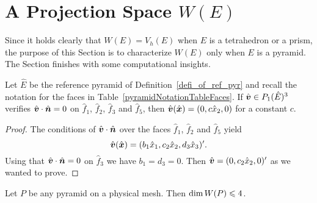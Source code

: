 \section{A Projection Space $W(E)$}
Since it holds clearly that $W(E)=V_h(E)$ when $E$ is a tetrahedron or a prism,
the purpose of this Section is to characterize $W(E)$ only when $E$ is a pyramid.
The Section finishes with some computational insights. 
\begin{lemma}\label{L3}
Let $\hat E$ be the reference pyramid 
of Definition~\ref{defi_of_ref_pyr} and recall the notation for the faces
in Table~\ref{pyramidNotationTableFaces}.
If $\hat{\boldsymbol{v}}\in P_1(\hat E)^3$ verifies $\hat{\boldsymbol{v}} \cdot \hat{\boldsymbol{n}} =0$ on
$\hat f_1$, $\hat f_2$, $\hat f_3$ and
$\hat f_5$, then $\hat{\boldsymbol{v}}(\hat{\boldsymbol{x}})=(0,c\hat x_2,0)$ for a constant $c$.
\end{lemma}
\begin{proof}
The conditions of $\hat{\boldsymbol{v}}\cdot\hat{\boldsymbol{n}}$ over the faces $\hat f_1$, $\hat f_2$ and
$\hat f_5$ yield
\[
\hat{\boldsymbol{v}}(\hat{\boldsymbol{x}}) = (b_1\hat x_1, c_2\hat x_2,d_3\hat x_3)'.
\]
Using that $\hat{\boldsymbol{v}}\cdot\hat{\boldsymbol{n}}=0$ on
$\hat f_3$  we have $b_1=d_3=0$. Then $\hat {\boldsymbol{v}}=(0,c_2\hat x_2,0)'$ as we wanted to prove.
\end{proof}
\begin{lemma}\label{L4}
Let $P$ be any pyramid on a physical mesh. Then $\mbox{dim\,}W(P)\leqslant 4$.
\end{lemma}
